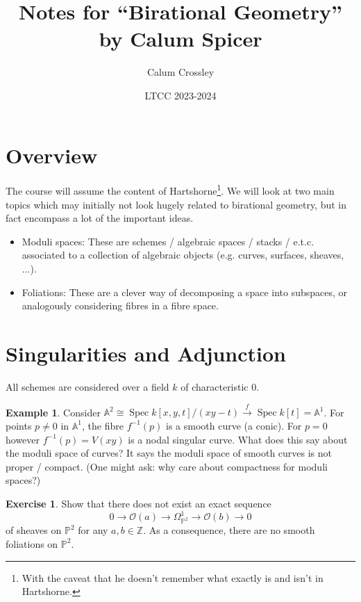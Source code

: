 \documentclass{article}
\title{Notes for ``Birational Geometry'' by Calum Spicer}
\author{Calum Crossley}
\date{LTCC 2023-2024}
\theoremstyle{definition}
\newtheorem*{example}{Example}
\newtheorem*{exercise}{Exercise}
\DeclareMathOperator{\Spec}{Spec}
\renewcommand{\O}{\mathcal{O}}
\newcommand{\A}{\mathbb{A}}
\renewcommand{\P}{\mathbb{P}}
\newcommand{\Z}{\mathbb{Z}}
\begin{document}
\maketitle

\section*{Overview}

The course will assume the content of Hartshorne\footnote{With the caveat that
he doesn't remember what exactly is and isn't in Hartshorne.}. We will look at
two main topics which may initially not look hugely related to birational
geometry, but in fact encompass a lot of the important ideas.
\begin{itemize}
    \item Moduli spaces: These are schemes / algebraic spaces / stacks / e.t.c.
        associated to a collection of algebraic objects (e.g. curves, surfaces,
        sheaves, ...).

    \item Foliations: These are a clever way of decomposing a space into
        subspaces, or analogously considering fibres in a fibre space.
\end{itemize}

\section*{Singularities and Adjunction}

All schemes are considered over a field $k$ of characteristic 0.

\begin{example}
    Consider $\A^2\cong\Spec k[x,y,t]/(xy-t)\xrightarrow{f}\Spec k[t]=\A^1$. For
    points $p\ne0$ in $\A^1$, the fibre $f^{-1}(p)$ is a smooth curve (a conic).
    For $p=0$ however  $f^{-1}(p)=V(xy)$ is a nodal singular curve. What does
    this say about the moduli space of curves? It says the moduli space of
    smooth curves is not proper / compact. (One might ask: why care about
    compactness for moduli spaces?)
\end{example}

\begin{exercise}
    Show that there does not exist an exact sequence
    \begin{equation*}
        0 \to \O(a) \to \Omega^1_{\P^2} \to \O(b) \to 0
    \end{equation*}
    of sheaves on $\P^2$ for any $a,b\in\Z$. As a consequence, there are no
    smooth foliations on $\P^2$.
\end{exercise}
\end{document}
